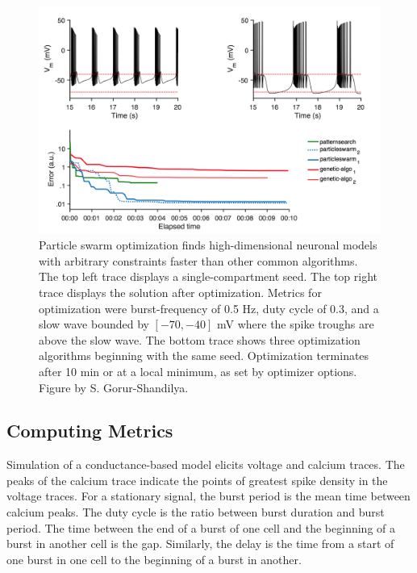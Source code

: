 \begin{figure}[h]
	\centering
	\includegraphics[width=1.0\linewidth]{gfx/ProcrustesExample}
	\caption[Parameter optimization using different algorithms]{Particle swarm optimization finds high-dimensional neuronal models with arbitrary constraints faster than other common algorithms. The top left trace displays a single-compartment seed. The top right trace displays the solution after optimization. Metrics for optimization were burst-frequency of 0.5 Hz, duty cycle of 0.3, and a slow wave bounded by $[-70, -40]$ mV where the spike troughs are above the slow wave. The bottom trace shows three optimization algorithms beginning with the same seed. Optimization terminates after 10 min or at a local minimum, as set by optimizer options. Figure by S. Gorur-Shandilya.}
	\label{fig:procrustesexample}
\end{figure}

\FloatBarrier

\subsection{Computing Metrics} \label{sec:metrics}
Simulation of a conductance-based model elicits voltage and calcium traces. The peaks of the calcium trace indicate the points of greatest spike density in the voltage traces. For a stationary signal, the burst period is the mean time between calcium peaks. The duty cycle is the ratio between burst duration and burst period. The time between the end of a burst of one cell and the beginning of a burst in another cell is the gap. Similarly, the delay is the time from a start of one burst in one cell to the beginning of a burst in another.

